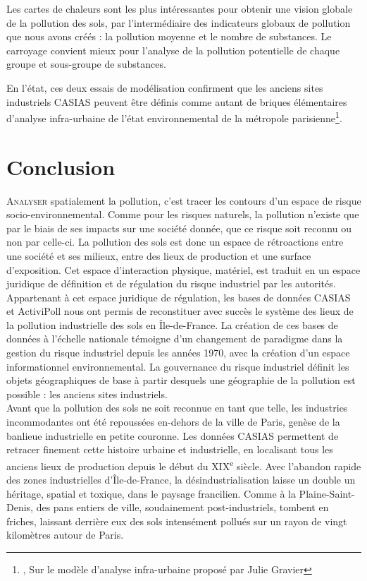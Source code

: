 \documentclass[a4paper,twoside,12pt]{book}
\newcommand{\siecle}[1]{\textsc{#1}\textsuperscript{e} siècle}
\begin{document}
Les cartes de chaleurs sont les plus intéressantes pour obtenir une vision globale de la pollution des sols, par l'intermédiaire des indicateurs globaux de pollution que nous avons créés : la pollution moyenne et le nombre de substances. Le carroyage convient mieux pour l'analyse de la pollution potentielle de chaque groupe et sous-groupe de substances.

En l'état, ces deux essais de modélisation confirment que les anciens sites industriels CASIAS peuvent être définis comme autant de briques élémentaires d'analyse infra-urbaine de l'état environnemental de la métropole parisienne\footnote{\cite{gravier_deux_2018}, Sur le modèle d'analyse infra-urbaine proposé par Julie Gravier }.

\chapter*{Conclusion}

\lettrine{A}{nalyser} spatialement la pollution, c'est tracer les contours d'un espace de risque socio-environnemental.  Comme pour les risques naturels, la pollution \og{} n'existe \fg{} que par le biais de ses impacts sur une société donnée, que ce risque soit reconnu ou non par celle-ci. La pollution des sols est donc un espace de rétroactions entre une société et ses milieux, entre des lieux de production et une surface d'exposition. Cet espace d'interaction physique, matériel, est traduit en un espace juridique de définition et de régulation du risque industriel par les autorités. Appartenant à cet espace juridique de régulation, les bases de données CASIAS et ActiviPoll nous ont permis de reconstituer avec succès le système des lieux de la pollution industrielle des sols en Île-de-France. La création de ces bases de données à l'échelle nationale témoigne d'un changement de paradigme dans la gestion du risque industriel depuis les années 1970, avec la création d'un espace informationnel environnemental. La gouvernance du risque industriel définit les objets géographiques de base à partir desquels une géographie de la pollution est possible : les anciens sites industriels. \\

Avant que la pollution des sols ne soit reconnue en tant que telle, les industries incommodantes ont été repoussées en-dehors de la ville de Paris, genèse de la banlieue industrielle en petite couronne. Les données CASIAS permettent de retracer finement cette histoire urbaine et industrielle, en localisant tous les anciens lieux de production depuis le début du \siecle{XIX}. Avec l'abandon rapide des zones industrielles d'Île-de-France, la désindustrialisation laisse un double un héritage, spatial et toxique, dans le paysage francilien. Comme à la Plaine-Saint-Denis, des pans entiers de ville, soudainement post-industriels, tombent en friches, laissant derrière eux des sols intensément pollués sur un rayon de vingt kilomètres autour de Paris.  \\
\end{document}
